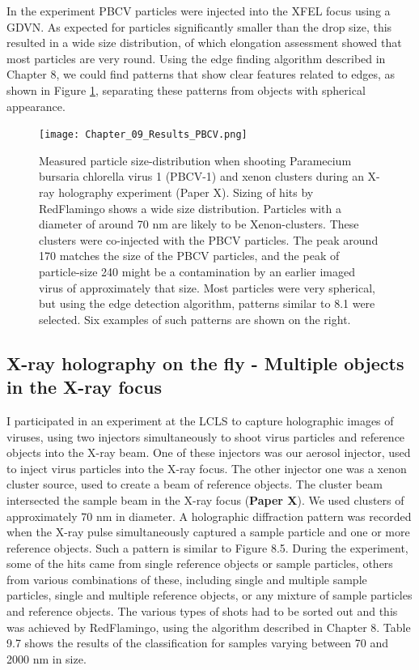 In the experiment PBCV particles were injected into the XFEL focus using a GDVN. As expected for particles significantly smaller than the drop size, this resulted in a wide size distribution, of which elongation assessment showed that most particles are very round. Using the edge finding algorithm described in Chapter 8, we could find patterns that show clear features related to edges, as shown in Figure \ref{fig:PatternSelection}, separating these patterns from objects with spherical appearance.

\begin{figure}[!ht]
\centering
\texttt{[image: Chapter\_09\_Results\_PBCV.png]}
\caption{Measured particle size-distribution when shooting Paramecium bursaria chlorella virus 1 (PBCV-1) and xenon clusters during an X-ray holography experiment (Paper X). Sizing of hits by RedFlamingo shows a wide size distribution. Particles with a diameter of around 70 nm are likely to be Xenon-clusters. These clusters were co-injected with the PBCV particles. The peak around 170 matches the size of the PBCV particles, and the peak of particle-size 240 might be a contamination by an earlier imaged virus of approximately that size. Most particles were very spherical, but using the edge detection algorithm, patterns similar to 8.1 were selected. Six examples of such patterns are shown on the right.}\label{fig:PatternSelection}

\end{figure}


\subsection{X-ray holography on the fly - Multiple objects in the X-ray focus}

I participated in an experiment at the LCLS to capture holographic images of viruses, using two injectors simultaneously to shoot virus particles and reference objects into the X-ray beam. One of these injectors was our aerosol injector, used to inject virus particles into the X-ray focus. The other injector one was a xenon cluster source, used  to create a beam of reference objects. The cluster beam intersected the sample beam in the X-ray focus (\textbf{Paper X}). We used clusters of approximately 70 nm in diameter. A holographic diffraction pattern was recorded when the X-ray pulse simultaneously captured a sample particle and one or more reference objects. Such a pattern is similar to Figure 8.5. During the experiment, some of the hits came from single reference objects or sample particles, others from various combinations of these, including single and multiple sample particles, single and multiple reference objects, or any mixture of sample particles and reference objects. The various types of shots had to be sorted out and this was achieved by RedFlamingo, using the algorithm described in Chapter 8. Table 9.7 shows the results of the classification for samples varying between 70 and 2000 nm in size. 

